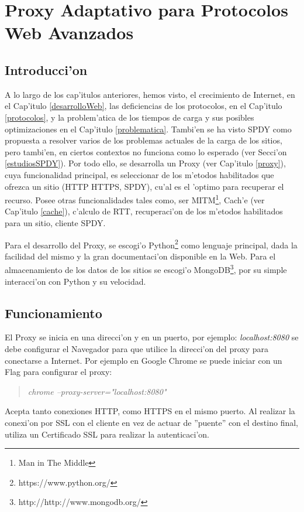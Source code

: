 \chapter{Proxy Adaptativo para Protocolos Web Avanzados}
\label{spdyproxypython}

\section{Introducci'on}

A lo largo de los cap'itulos anteriores, hemos visto, el crecimiento de Internet, en el Cap'itulo \ref{desarrolloWeb}, las deficiencias de los protocolos, en el Cap'itulo \ref{protocolos}, y la problem'atica de los tiempos de carga y sus posibles optimizaciones en el Cap'itulo \ref{problematica}. Tambi'en se ha visto SPDY como propuesta a resolver varios de los problemas actuales de la carga de los sitios, pero tambi'en, en ciertos contextos no funciona como lo esperado (ver Secci'on \ref{estudiosSPDY}). Por todo ello, se desarrolla un Proxy (ver Cap'itulo \ref{proxy}), cuya funcionalidad principal, es seleccionar de los m'etodos habilitados que ofrezca un sitio (HTTP HTTPS, SPDY), cu'al es el 'optimo para recuperar el recurso. Posee otras funcionalidades tales como, ser MITM\footnote{Man in The Middle}, Cach'e (ver Cap'itulo \ref{cache}), c'alculo de RTT, recuperaci'on de los m'etodos habilitados para un sitio, cliente SPDY.

Para el desarrollo del Proxy, se escogi'o Python\footnote{https://www.python.org/} como lenguaje principal, dada la facilidad del mismo y la gran documentaci'on disponible en la Web. Para el almacenamiento de los datos de los sitios se escogi'o MongoDB\footnote{http://http://www.mongodb.org/}, por su simple interacci'on con Python y su velocidad.

\section{Funcionamiento}

El Proxy se inicia en una direcci'on y en un puerto, por ejemplo: \textit{localhost:8080} se debe configurar el Navegador para que utilice la direcci'on del proxy para conectarse a Internet. Por ejemplo en Google Chrome se puede iniciar con un Flag para configurar el proxy:
\begin{quote}
\textit{chrome --proxy-server="localhost:8080"}
\end{quote}
Acepta tanto conexiones HTTP, como HTTPS en el mismo puerto. Al realizar la conexi'on por SSL con el cliente en vez de actuar de ''puente'' con el destino final, utiliza un Certificado SSL para realizar la autenticaci'on.

